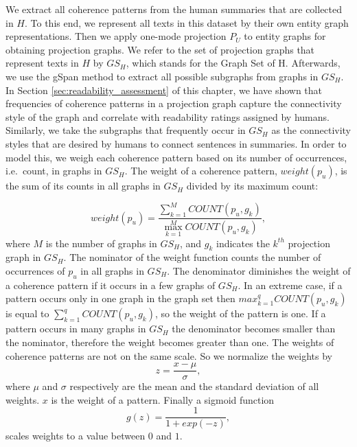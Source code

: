 We extract all coherence patterns from the human summaries that are collected in $H$. 
To this end, we represent all texts in this dataset by their own entity graph representations. 
Then we apply one-mode projection $P_U$ to entity graphs for obtaining projection graphs. 
We refer to the set of projection graphs that represent texts in $H$ by $GS_H$, which stands for the Graph Set of H. 
Afterwards, we use the gSpan method to extract all possible subgraphs from  graphs in $GS_H$. 
In Section \ref{sec:readability_assessment} of this chapter, we have shown that frequencies of coherence patterns in a projection graph capture the connectivity style of the graph and correlate with readability ratings assigned by humans.  
Similarly, we take the subgraphs that frequently occur in $GS_H$ as the connectivity styles that are desired by humans to connect sentences in summaries. 
In order to model this, we weigh each coherence pattern based on its number of occurrences, i.e.\ count, in graphs in $GS_H$.  
The weight of a coherence pattern, $weight(p_u)$, is the sum of its counts in all graphs in $GS_H$ divided by its maximum count:

\begin{equation}
weight(p_u) = \frac{\sum_{k=1}^{M}{COUNT(p_u,g_k)}}{\max_{k=1}^{M}{COUNT(p_u,g_k)}},
\end{equation}
where $M$ is the number of graphs in $GS_H$, and $g_k$ indicates the $k^{th}$ projection graph in $GS_H$.
The nominator of the weight function counts the number of occurrences of $p_u$ in all graphs in $GS_H$. 
The denominator diminishes the weight of a coherence pattern if it  occurs in a few graphs of $GS_H$. 
In an extreme case, if a pattern occurs only in one graph in the graph set then $max_{k=1}^{q}{COUNT(p_u,g_k)}$ is equal to $\sum_{k=1}^{q}{COUNT(p_u,g_k)}$, so the weight of the pattern is one. 
If a pattern occurs in many graphs in $GS_H$ the denominator becomes smaller than the nominator, therefore the weight becomes greater than one. 
The weights of coherence patterns are not on the same scale.  
So we normalize the weights by 
\begin{equation}
z = \frac{x-\mu}{\sigma},
\end{equation}
where $\mu$ and $\sigma$ respectively are the mean and the standard deviation of all weights. $x$ is the weight of a pattern.   
Finally a sigmoid function
\begin{equation}
 g(z) = \frac{1}{1+exp(-z)},
\end{equation}
scales weights to a value between $0$ and $1$. 

